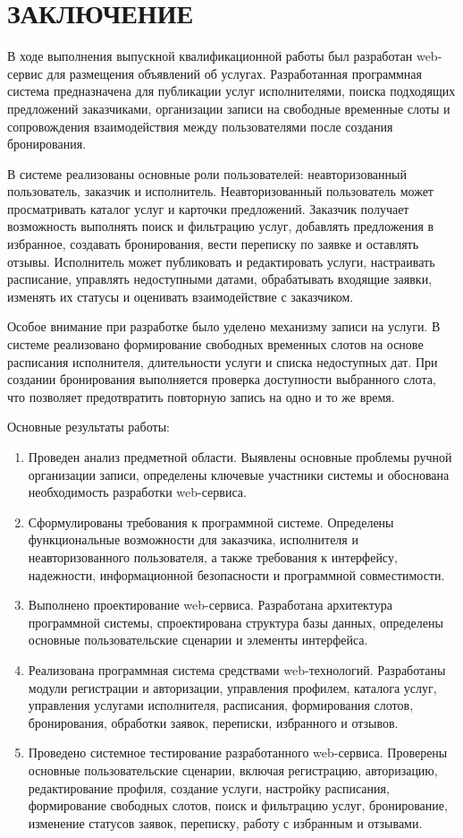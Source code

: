 \section*{ЗАКЛЮЧЕНИЕ}

В ходе выполнения выпускной квалификационной работы был разработан web-сервис для размещения объявлений об услугах. Разработанная программная система предназначена для публикации услуг исполнителями, поиска подходящих предложений заказчиками, организации записи на свободные временные слоты и сопровождения взаимодействия между пользователями после создания бронирования.

В системе реализованы основные роли пользователей: неавторизованный пользователь, заказчик и исполнитель. Неавторизованный пользователь может просматривать каталог услуг и карточки предложений. Заказчик получает возможность выполнять поиск и фильтрацию услуг, добавлять предложения в избранное, создавать бронирования, вести переписку по заявке и оставлять отзывы. Исполнитель может публиковать и редактировать услуги, настраивать расписание, управлять недоступными датами, обрабатывать входящие заявки, изменять их статусы и оценивать взаимодействие с заказчиком.

Особое внимание при разработке было уделено механизму записи на услуги. В системе реализовано формирование свободных временных слотов на основе расписания исполнителя, длительности услуги и списка недоступных дат. При создании бронирования выполняется проверка доступности выбранного слота, что позволяет предотвратить повторную запись на одно и то же время.

Основные результаты работы:

\begin{enumerate}
	\item Проведен анализ предметной области. Выявлены основные проблемы ручной организации записи, определены ключевые участники системы и обоснована необходимость разработки web-сервиса.
	\item Сформулированы требования к программной системе. Определены функциональные возможности для заказчика, исполнителя и неавторизованного пользователя, а также требования к интерфейсу, надежности, информационной безопасности и программной совместимости.
	\item Выполнено проектирование web-сервиса. Разработана архитектура программной системы, спроектирована структура базы данных, определены основные пользовательские сценарии и элементы интерфейса.
	\item Реализована программная система средствами web-технологий. Разработаны модули регистрации и авторизации, управления профилем, каталога услуг, управления услугами исполнителя, расписания, формирования слотов, бронирования, обработки заявок, переписки, избранного и отзывов.
	\item Проведено системное тестирование разработанного web-сервиса. Проверены основные пользовательские сценарии, включая регистрацию, авторизацию, редактирование профиля, создание услуги, настройку расписания, формирование свободных слотов, поиск и фильтрацию услуг, бронирование, изменение статусов заявок, переписку, работу с избранным и отзывами.
\end{enumerate}

